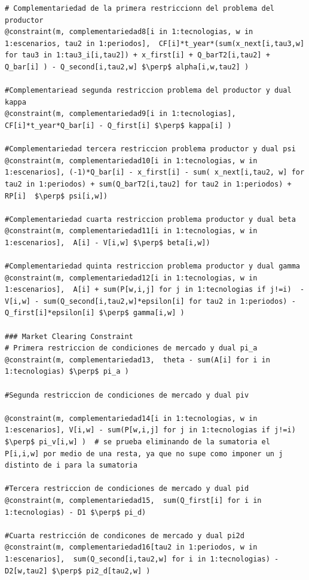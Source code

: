 \begin{footnotesize}
\begin{lstlisting}
# Complementariedad de la primera restriccionn del problema del productor
@constraint(m, complementariedad8[i in 1:tecnologias, w in 1:escenarios, tau2 in 1:periodos],  CF[i]*t_year*(sum(x_next[i,tau3,w] for tau3 in 1:tau3_i[i,tau2]) + x_first[i] + Q_barT2[i,tau2] + Q_bar[i] ) - Q_second[i,tau2,w] $\perp$ alpha[i,w,tau2] )

#Complementariead segunda restriccion problema del productor y dual kappa
@constraint(m, complementariedad9[i in 1:tecnologias],  CF[i]*t_year*Q_bar[i] - Q_first[i] $\perp$ kappa[i] )

#Complementariedad tercera restriccion problema productor y dual psi
@constraint(m, complementariedad10[i in 1:tecnologias, w in 1:escenarios], (-1)*Q_bar[i] - x_first[i] - sum( x_next[i,tau2, w] for tau2 in 1:periodos) + sum(Q_barT2[i,tau2] for tau2 in 1:periodos) + RP[i]  $\perp$ psi[i,w])

#Complementariedad cuarta restriccion problema productor y dual beta
@constraint(m, complementariedad11[i in 1:tecnologias, w in 1:escenarios],  A[i] - V[i,w] $\perp$ beta[i,w])

#Complementariedad quinta restriccion problema productor y dual gamma
@constraint(m, complementariedad12[i in 1:tecnologias, w in 1:escenarios],  A[i] + sum(P[w,i,j] for j in 1:tecnologias if j!=i)  - V[i,w] - sum(Q_second[i,tau2,w]*epsilon[i] for tau2 in 1:periodos) - Q_first[i]*epsilon[i] $\perp$ gamma[i,w] )

### Market Clearing Constraint
# Primera restriccion de condiciones de mercado y dual pi_a
@constraint(m, complementariedad13,  theta - sum(A[i] for i in 1:tecnologias) $\perp$ pi_a )

#Segunda restriccion de condiciones de mercado y dual piv

@constraint(m, complementariedad14[i in 1:tecnologias, w in 1:escenarios], V[i,w] - sum(P[w,i,j] for j in 1:tecnologias if j!=i) $\perp$ pi_v[i,w] )  # se prueba eliminando de la sumatoria el P[i,i,w] por medio de una resta, ya que no supe como imponer un j distinto de i para la sumatoria

#Tercera restriccion de condiciones de mercado y dual pid
@constraint(m, complementariedad15,  sum(Q_first[i] for i in 1:tecnologias) - D1 $\perp$ pi_d)

#Cuarta restricción de condicones de mercado y dual pi2d
@constraint(m, complementariedad16[tau2 in 1:periodos, w in 1:escenarios],  sum(Q_second[i,tau2,w] for i in 1:tecnologias) - D2[w,tau2] $\perp$ pi2_d[tau2,w] )



\end{lstlisting}
\end{footnotesize}
